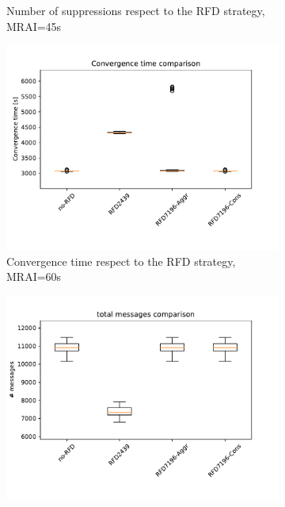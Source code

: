 \begin{figure}[H]
\begin{subfigure}[b]{0.325\textwidth}
         \caption{Number of suppressions respect to the RFD strategy, MRAI=45s}
         \label{fig:1000_RFD_MRAI30_suppressions_mice}
     \end{subfigure}
     \vfill
     \begin{subfigure}[b]{0.325\textwidth}
         \centering
         \includegraphics[width=\textwidth]{images/RFD/miceVSelephants/MultiMRAI/60/mice/cisco_1000MRAI60_rfd_comparison_time_boxplot.pdf}
         \caption{Convergence time respect to the RFD strategy, MRAI=60s}
         \label{fig:1000_RFD_MRAI30_time_mice}
     \end{subfigure}
     \hfill
     \begin{subfigure}[b]{0.325\textwidth}
         \centering
         \includegraphics[width=\textwidth]{images/RFD/miceVSelephants/MultiMRAI/60/mice/cisco_1000MRAI60_rfd_comparison_messages_boxplot.pdf}

\end{subfigure}
\end{figure}
